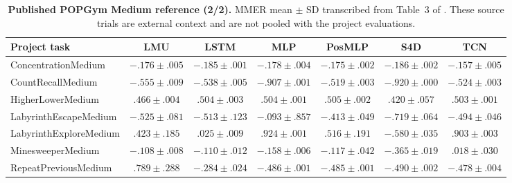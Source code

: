 \begin{table}[p]
\centering\scriptsize
\setlength{\tabcolsep}{2.7pt}
\renewcommand{\arraystretch}{1.08}
\caption{\textbf{Published POPGym Medium reference (2/2).} MMER mean $\pm$ SD transcribed from Table~3 of \citet{morad2023popgym}. These source trials are external context and are not pooled with the project evaluations.}
\label{table:popgym_published_medium_2}
\begin{tabular}{@{}p{}cccccc@{}}
\toprule
Project task & LMU & LSTM & MLP & PosMLP & S4D & TCN \\
\midrule
ConcentrationMedium & $-.176\pm.005$ & $-.185\pm.001$ & $-.178\pm.004$ & $-.175\pm.002$ & $-.186\pm.002$ & $-.157\pm.005$ \\
CountRecallMedium & $-.555\pm.009$ & $-.538\pm.005$ & $-.907\pm.001$ & $-.519\pm.003$ & $-.920\pm.000$ & $-.524\pm.003$ \\
HigherLowerMedium & $.466\pm.004$ & $.504\pm.003$ & $.504\pm.001$ & $.505\pm.002$ & $.420\pm.057$ & $.503\pm.001$ \\
LabyrinthEscapeMedium & $-.525\pm.081$ & $-.513\pm.123$ & $-.093\pm.857$ & $-.413\pm.049$ & $-.719\pm.064$ & $-.494\pm.046$ \\
LabyrinthExploreMedium & $.423\pm.185$ & $.025\pm.009$ & $.924\pm.001$ & $.516\pm.191$ & $-.580\pm.035$ & $.903\pm.003$ \\
MinesweeperMedium & $-.108\pm.008$ & $-.110\pm.012$ & $-.158\pm.006$ & $-.117\pm.042$ & $-.365\pm.019$ & $.018\pm.030$ \\
RepeatPreviousMedium & $.789\pm.288$ & $-.284\pm.024$ & $-.486\pm.001$ & $-.485\pm.001$ & $-.490\pm.002$ & $-.478\pm.004$ \\
\bottomrule
\end{tabular}
\end{table}
